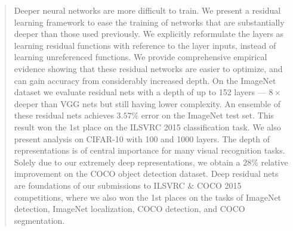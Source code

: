 \begin{abstract}
Deeper neural networks are more difficult to train. We present a residual
learning framework to ease the training of networks that are substantially
deeper than those used previously. We explicitly reformulate the layers as
learning residual functions with reference to the layer inputs, instead of
learning unreferenced functions. We provide comprehensive empirical evidence
showing that these residual networks are easier to optimize, and can gain
accuracy from considerably increased depth. On the ImageNet dataset we evaluate
residual nets with a depth of up to 152 layers --- $8\times$ deeper than VGG
nets but still having lower complexity. An ensemble of these residual nets
achieves $3.57\%$ error on the ImageNet test set. This result won the 1st place
on the ILSVRC 2015 classification task. We also present analysis on CIFAR-10
with 100 and 1000 layers. The depth of representations is of central importance
for many visual recognition tasks. Solely due to our extremely deep
representations, we obtain a $28\%$ relative improvement on the COCO object
detection dataset. Deep residual nets are foundations of our submissions to
ILSVRC \& COCO 2015 competitions, where we also won the 1st places on the tasks
of ImageNet detection, ImageNet localization, COCO detection, and COCO
segmentation.
\end{abstract}
